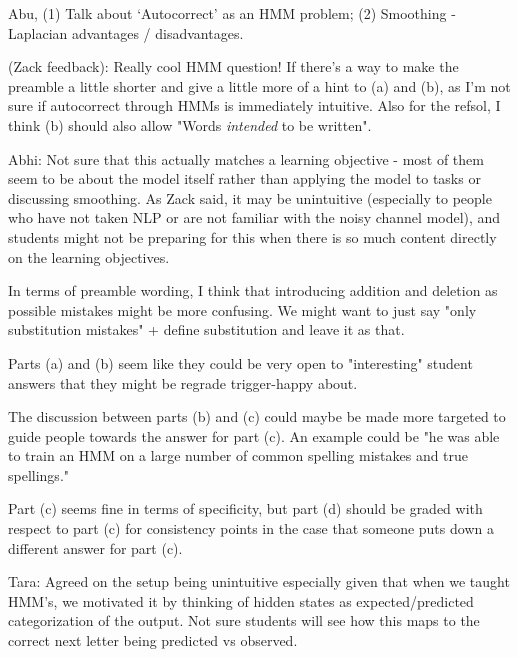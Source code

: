 \begin{parts}
\begin{subparts}

\end{subparts}
\begin{qauthor}
Abu, (1) Talk about ‘Autocorrect’ as an HMM problem; (2) Smoothing - Laplacian advantages / disadvantages.

(Zack feedback): Really cool HMM question! If there's a way to make the preamble a little shorter and give a little more of a hint to (a) and (b), as I'm not sure if autocorrect through HMMs is immediately intuitive. Also for the refsol, I think (b) should also allow "Words \textit{intended} to be written".

Abhi: Not sure that this actually matches a learning objective - most of them seem to be about the model itself rather than applying the model to tasks or discussing smoothing. As Zack said, it may be unintuitive (especially to people who have not taken NLP or are not familiar with the noisy channel model), and students might not be preparing for this when there is so much content directly on the learning objectives.

In terms of preamble wording, I think that introducing addition and deletion as possible mistakes might be more confusing. We might want to just say "only substitution mistakes" + define substitution and leave it as that.

Parts (a) and (b) seem like they could be very open to "interesting" student answers that they might be regrade trigger-happy about.

The discussion between parts (b) and (c) could maybe be made more targeted to guide people towards the answer for part (c). An example could be "he was able to train an HMM on a large number of common spelling mistakes and true spellings."

Part (c) seems fine in terms of specificity, but part (d) should be graded with respect to part (c) for consistency points in the case that someone puts down a different answer for part (c).

Tara: Agreed on the setup being unintuitive especially given that when we taught HMM's, we motivated it by thinking of hidden states as expected/predicted categorization of the output. Not sure students will see how this maps to the correct next letter being predicted vs observed. 


\end{qauthor}
\end{parts}

